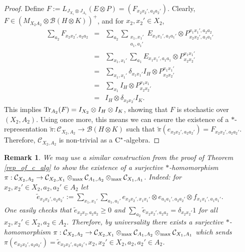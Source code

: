 \documentclass[11pt]{amsart}
\newtheorem{remark}[theorem]{Remark}
\newcommand{\cl}[1]{\mathcal{#1}}
\begin{document}
\begin{proof}
Define $F := L_{J_{X_{1}}\otimes J_{A_{1}}}(E\otimes P) = (F_{x_{2}x_{2}', a_{2}a_{2}'})$. Clearly, $F \in (M_{X_{2}A_{2}}\otimes \cl{B}(H\otimes K))^{+}$, and for $x_{2}, x_{2}' \in X_{2}$,
\begin{eqnarray*}
	\sum_{a_{2}}F_{x_{2}x_{2}', a_{2}a_{2}}
& = &
\sum\limits_{a_{2}}\sum\limits_{\substack{x_{1}, x_{1}' \\ a_{1}, a_{1}'}}E_{x_{1}x_{1}', a_{1}a_{1}'}\otimes P_{x_{2}x_{2}', a_{1}a_{1}'}^{x_{1}x_{1}', a_{2}a_{2}} \\
& = &
\sum\limits_{x_{1}, x_{1}'}\sum\limits_{a_{1}}E_{x_{1}x_{1}', a_{1}a_{1}}\otimes P_{x_{2}x_{2}'}^{x_{1}x_{1}'}\\
& = &
\sum\limits_{x_{1}, x_{1}'}\delta_{x_{1}x_{1}'}I_{H}\otimes P_{x_{2}x_{2}'}^{x_{1}x_{1}'} \\
& = &
\sum\limits_{x_{1}}I_{H}\otimes P_{x_{2}x_{2}'}^{x_{1}x_{1}} \\
& = &
I_{H}\otimes \delta_{x_{2}x_{2}'}I_{K}.
\end{eqnarray*}
\noindent This implies ${\rm Tr}_{A_{2}}(F) = I_{X_{2}}\otimes I_{H}\otimes I_{K}$, showing that $F$ is stochastic over $(X_{2}, A_{2})$. Using \cite[Theorem 5.2]{tt} once more, this means we can ensure the existence of a $*$-representation $\tilde{\pi}: \cl{C}_{X_{2}, A_{2}}\rightarrow \cl{B}(H\otimes K)$ such that $\tilde{\pi}(e_{x_{2}x_{2}', a_{2}a_{2}'}) = F_{x_{2}x_{2}', a_{2}a_{2}'}$. Therefore, $\cl{C}_{X_{2}, A_{2}}$ is non-trivial as a ${\rm C}^{*}$-algebra. 
\end{proof}
\begin{remark}\label{hom_from_max_tensor_prod}
\rm We may use a similar construction from the proof of Theorem \ref{rep_of_c_alg} to show the existence of a surjective $*$-homomorphism $\pi: \cl{C}_{X_{2}, A_{2}}\rightarrow \cl{C}_{X_{2}, X_{1}}\otimes_{\rm max} \cl{C}_{A_{1}, A_{2}}\otimes_{\rm max} \cl{C}_{X_{1}, A_{1}}$. Indeed: for $x_{2}, x_{2}' \in X_{2}, a_{2}, a_{2}' \in A_{2}$ let
\begin{gather*}
	\tilde{e}_{x_{2}x_{2}', a_{2}a_{2}'} := \sum\limits_{x_{1}, x_{1}'}\sum\limits_{a_{1}, a_{1}'}e_{x_{2}x_{2}', x_{1}x_{1}'}\otimes e_{a_{1}a_{1}', a_{2}a_{2}'}\otimes f_{x_{1}x_{1}', a_{1}a_{1}'}.
\end{gather*}
\noindent One easily checks that $\tilde{e}_{x_{2}x_{2}, a_{2}a_{2}} \geq 0$ and $\sum_{a_{2}}\tilde{e}_{x_{2}x_{2}', a_{2}a_{2}} = \delta_{x_{2}x_{2}'}1$ for all $x_{2}, x_{2}' \in X_{2}, a_{2} \in A_{2}$. Therefore, by universality there exists a surjective $*$-homomorphism $\pi: \cl{C}_{X_{2}, A_{2}} \rightarrow \cl{C}_{X_{2}, X_{1}}\otimes_{\rm max} \cl{C}_{A_{1}, A_{2}}\otimes_{\rm max} \cl{C}_{X_{1}, A_{1}}$ which sends $\pi(e_{x_{2}x_{2}', a_{2}a_{2}'}) = \tilde{e}_{x_{2}x_{2}', a_{2}a_{2}'}, x_{2}, x_{2}' \in X_{2}, a_{2}, a_{2}' \in A_{2}$. 
\end{remark}
\end{document}
